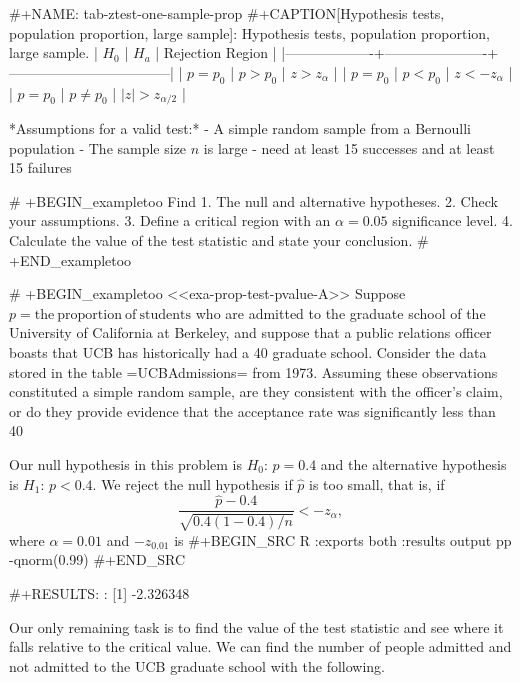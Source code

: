 #+NAME: tab-ztest-one-sample-prop
#+CAPTION[Hypothesis tests, population proportion, large sample]: Hypothesis tests, population proportion, large sample.
| \(H_{0}\)         | \(H_{a}\)            | Rejection Region                  |
|-------------------+----------------------+-----------------------------------|
| \(p = p_{0}\)     | \(p > p_{0}\)        | \(z > z_{\alpha}\)                |
| \(p = p_{0}\)     | \(p < p_{0}\)        | \(z < -z_{\alpha}\)               |
| \(p = p_{0}\)     | \(p \neq p_{0}\)     | \( \vert z \vert > z_{\alpha/2}\) |

*Assumptions for a valid test:*
- A simple random sample from a Bernoulli population
- The sample size \(n\) is large
  - need at least 15 successes and at least 15 failures

# +BEGIN_exampletoo
Find
1. The null and alternative hypotheses.
2. Check your assumptions.
3. Define a critical region with an \(\alpha=0.05\) significance
   level.
4. Calculate the value of the test statistic and state your
   conclusion.
# +END_exampletoo


# +BEGIN_exampletoo
<<exa-prop-test-pvalue-A>> Suppose \(p = \mathrm{the\ proportion\ of\
students}\) who are admitted to the graduate school of the University
of California at Berkeley, and suppose that a public relations officer
boasts that UCB has historically had a 40%
graduate school. Consider the data stored in the table =UCBAdmissions=
from 1973. Assuming these observations constituted a simple random
sample, are they consistent with the officer's claim, or do they
provide evidence that the acceptance rate was significantly less than
40%

Our null hypothesis in this problem is \(H_{0}:\,p = 0.4\) and the
alternative hypothesis is \(H_{1}:\,p < 0.4\). We reject the null
hypothesis if \(\hat{p}\) is too small, that is, if
\begin{equation}
\frac{\hat{p} - 0.4}{\sqrt{0.4(1 - 0.4)/n}} < -z_{\alpha},
\end{equation}
where \(\alpha = 0.01\) and \(-z_{0.01}\) is 
#+BEGIN_SRC R :exports both :results output pp 
-qnorm(0.99)
#+END_SRC

#+RESULTS:
: [1] -2.326348

Our only remaining task is to find the value of the test statistic and
see where it falls relative to the critical value. We can find the
number of people admitted and not admitted to the UCB graduate school
with the following.

